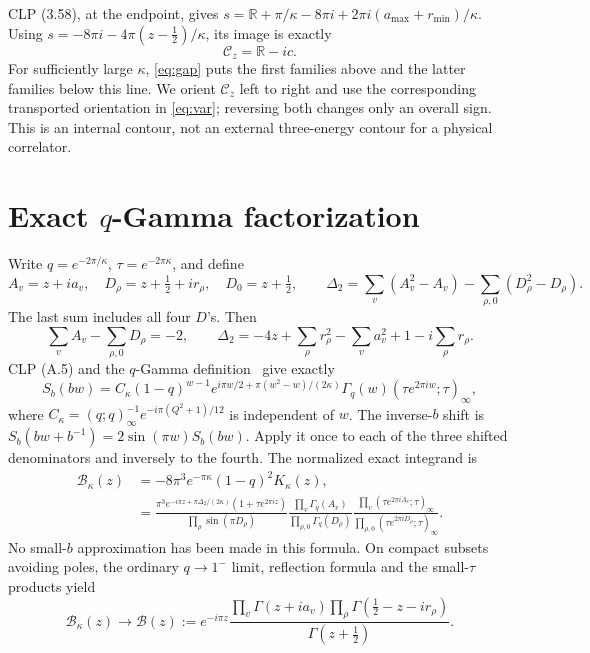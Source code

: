 \documentclass[11pt,a4paper]{article}
\begin{document}
CLP (3.58), at the endpoint, gives
\(s=\mathbb R+\pi/\kappa-8\pi i+2\pi i(a_{\max}+r_{\min})/\kappa\).
Using \(s=-8\pi i-4\pi(z-\frac12)/\kappa\), its image is exactly
\begin{equation}
 \mathcal C_z=\mathbb R-ic. \label{eq:horizontal}
\end{equation}
For sufficiently large \(\kappa\), \eqref{eq:gap} puts the first
families above and the latter families below this line.
We orient \(\mathcal C_z\) left to right and use the corresponding
transported orientation in \eqref{eq:var}; reversing both changes only
an overall sign. This is an internal contour, not an external
three-energy contour for a physical correlator.

\section{Exact \texorpdfstring{\(q\)}{q}-Gamma factorization}
Write \(q=e^{-2\pi/\kappa}\), \(\tau=e^{-2\pi\kappa}\), and define
\[
 A_v=z+ia_v,\quad D_\rho=z+\tfrac12+ir_\rho,\quad D_0=z+\tfrac12,
 \qquad
 \Delta_2=\sum_v(A_v^2-A_v)-\sum_{\rho,0}(D_\rho^2-D_\rho).
\]
The last sum includes all four \(D\)'s. Then
\[
 \sum_v A_v-\sum_{\rho,0}D_\rho=-2,\qquad
 \Delta_2=-4z+\sum_\rho r_\rho^2-\sum_v a_v^2+1-i\sum_\rho r_\rho .
\]
CLP (A.5) and the \(q\)-Gamma definition~\cite{DLMFq} give exactly
\begin{equation}
 S_b(bw)=C_\kappa(1-q)^{w-1}
 e^{i\pi w/2+\pi(w^2-w)/(2\kappa)}
 \Gamma_q(w)(\tau e^{2\pi iw};\tau)_\infty, \label{eq:sb}
\end{equation}
where \(C_\kappa=(q;q)_\infty^{-1}e^{-i\pi(Q^2+1)/12}\)
is independent of \(w\).
The inverse-\(b\) shift is
\(S_b(bw+b^{-1})=2\sin(\pi w)S_b(bw)\).
Apply it once to each of the three shifted denominators and inversely
to the fourth. The normalized exact integrand is
\begin{align}
 \mathcal B_\kappa(z)&=-8\pi^3 e^{-\pi\kappa}(1-q)^2K_\kappa(z),\\
 &=\frac{\pi^3e^{-i\pi z+\pi\Delta_2/(2\kappa)}
                  (1+\tau e^{2\pi iz})}
              {\prod_\rho\sin(\pi D_\rho)}
 \frac{\prod_v\Gamma_q(A_v)}{\prod_{\rho,0}\Gamma_q(D_\rho)}
 \frac{\prod_v(\tau e^{2\pi iA_v};\tau)_\infty}
      {\prod_{\rho,0}(\tau e^{2\pi iD_\rho};\tau)_\infty}.
 \label{eq:Bq}
\end{align}
No small-\(b\) approximation has been made in this formula.
On compact subsets avoiding poles, the ordinary \(q\to1^-\) limit,
reflection formula and the small-\(\tau\) products yield
\begin{equation}
 \mathcal B_\kappa(z)\longrightarrow
 \mathcal B(z):=e^{-i\pi z}
 \frac{\prod_v\Gamma(z+ia_v)
       \prod_\rho\Gamma(\frac12-z-ir_\rho)}
      {\Gamma(z+\frac12)}. \label{eq:B}
\end{equation}
\end{document}
